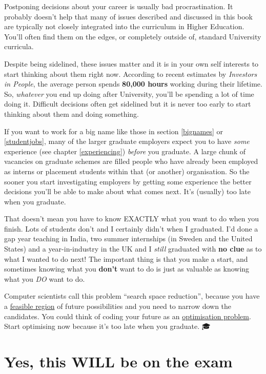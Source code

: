 \documentclass[
]{book}
\begin{document}
Postponing decisions about your career is usually bad procrastination. It probably doesn't help that many of issues described and discussed in this book are typically not closely integrated into the curriculum in Higher Education. You'll often find them on the edges, or completely outside of, standard University curricula.

Despite being sidelined, these issues matter and it is in your own self interests to start thinking about them right now. According to recent estimates by \emph{Investors in People}, the average person spends \textbf{80,000 hours} working during their lifetime. \citep{iip2} So, \emph{whatever} you end up doing after University, you'll be spending a lot of time doing it. Difficult decisions often get sidelined but it is never too early to start thinking about them and doing something.

If you want to work for a big name like those in section \ref{bignames} or \ref{studentjobs}, many of the larger graduate employers expect you to have \emph{some} experience (see chapter \ref{experiencing}) \emph{before} you graduate. A large chunk of vacancies on graduate schemes are filled people who have already been employed as interns or placement students within that (or another) organisation. So the sooner you start investigating employers by getting some experience the better decisions you'll be able to make about what comes next. It's (usually) too late when you graduate.

That doesn't mean you have to know EXACTLY what you want to do when you finish. Lots of students don't and I certainly didn't when I graduated. I'd done a gap year teaching in India, two summer internships (in Sweden and the United States) and a year-in-industry in the UK and I \emph{still} graduated with \textbf{no clue} as to what I wanted to do next! The important thing is that you make a start, and sometimes knowing what you \textbf{don't} want to do is just as valuable as knowing what you \emph{DO} want to do.

Computer scientists call this problem ``search space reduction'', \citep{searchspace} because you have a \href{https://en.wikipedia.org/wiki/Feasible_region}{feasible region} of future possibilities and you need to narrow down the candidates. You could think of coding your future as an \href{https://en.wikipedia.org/wiki/Optimization_problem}{optimisation problem}. Start optimising now because it's too late when you graduate. 🎓

\hypertarget{exams}{%
\section{Yes, this WILL be on the exam}\label{exams}}
\end{document}
